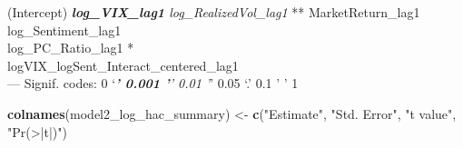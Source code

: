 \documentclass[
]{article}
\newenvironment{Shaded}{\begin{snugshade}}{\end{snugshade}}
\newcommand{\FunctionTok}[1]{\textcolor[rgb]{0.13,0.29,0.53}{\textbf{#1}}}
\newcommand{\NormalTok}[1]{#1}
\newcommand{\OtherTok}[1]{\textcolor[rgb]{0.56,0.35,0.01}{#1}}
\newcommand{\StringTok}[1]{\textcolor[rgb]{0.31,0.60,0.02}{#1}}
\begin{document}
(Intercept) \emph{\textbf{ log\_VIX\_lag1 } log\_RealizedVol\_lag1 }**
MarketReturn\_lag1\\
log\_Sentiment\_lag1\\
log\_PC\_Ratio\_lag1 *\\
logVIX\_logSent\_Interact\_centered\_lag1\\
--- Signif. codes: 0 `\emph{\textbf{' 0.001 '}' 0.01 '}' 0.05 `.' 0.1 '
' 1

\begin{Shaded}
\begin{Highlighting}[]
  \FunctionTok{colnames}\NormalTok{(model2\_log\_hac\_summary) }\OtherTok{\textless{}{-}} \FunctionTok{c}\NormalTok{(}\StringTok{"Estimate"}\NormalTok{, }\StringTok{"Std. Error"}\NormalTok{, }\StringTok{"t value"}\NormalTok{, }\StringTok{"Pr(\textgreater{}|t|)"}\NormalTok{)}
      


\end{Highlighting}
\end{Shaded}
\end{document}
